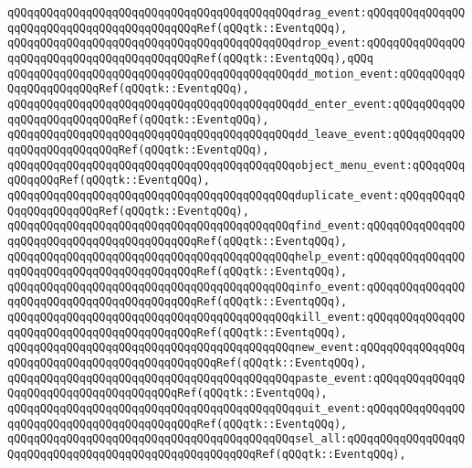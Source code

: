 \newline
\verb|qQQqqQQqqQQqqQQqqQQqqQQqqQQqqQQqqQQqqQQqqQQqdrag_event:qQQqqQQqqQQqqQQqqQQqqQQqqQQqqQQqqQQqqQQqqQQqRef(qQQqtk::EventqQQq),|\newline
\verb|qQQqqQQqqQQqqQQqqQQqqQQqqQQqqQQqqQQqqQQqqQQqdrop_event:qQQqqQQqqQQqqQQqqQQqqQQqqQQqqQQqqQQqqQQqqQQqRef(qQQqtk::EventqQQq),qQQq|\newline
\verb|qQQqqQQqqQQqqQQqqQQqqQQqqQQqqQQqqQQqqQQqqQQqdd_motion_event:qQQqqQQqqQQqqQQqqQQqqQQqRef(qQQqtk::EventqQQq),|\newline
\verb|qQQqqQQqqQQqqQQqqQQqqQQqqQQqqQQqqQQqqQQqqQQqdd_enter_event:qQQqqQQqqQQqqQQqqQQqqQQqqQQqRef(qQQqtk::EventqQQq),|\newline
\verb|qQQqqQQqqQQqqQQqqQQqqQQqqQQqqQQqqQQqqQQqqQQqdd_leave_event:qQQqqQQqqQQqqQQqqQQqqQQqqQQqRef(qQQqtk::EventqQQq),|\newline
\newline
\verb|qQQqqQQqqQQqqQQqqQQqqQQqqQQqqQQqqQQqqQQqqQQqobject_menu_event:qQQqqQQqqQQqqQQqRef(qQQqtk::EventqQQq),|\newline
\newline
\verb|qQQqqQQqqQQqqQQqqQQqqQQqqQQqqQQqqQQqqQQqqQQqduplicate_event:qQQqqQQqqQQqqQQqqQQqqQQqRef(qQQqtk::EventqQQq),|\newline
\verb|qQQqqQQqqQQqqQQqqQQqqQQqqQQqqQQqqQQqqQQqqQQqfind_event:qQQqqQQqqQQqqQQqqQQqqQQqqQQqqQQqqQQqqQQqqQQqRef(qQQqtk::EventqQQq),|\newline
\verb|qQQqqQQqqQQqqQQqqQQqqQQqqQQqqQQqqQQqqQQqqQQqhelp_event:qQQqqQQqqQQqqQQqqQQqqQQqqQQqqQQqqQQqqQQqqQQqRef(qQQqtk::EventqQQq),|\newline
\verb|qQQqqQQqqQQqqQQqqQQqqQQqqQQqqQQqqQQqqQQqqQQqinfo_event:qQQqqQQqqQQqqQQqqQQqqQQqqQQqqQQqqQQqqQQqqQQqRef(qQQqtk::EventqQQq),|\newline
\verb|qQQqqQQqqQQqqQQqqQQqqQQqqQQqqQQqqQQqqQQqqQQqkill_event:qQQqqQQqqQQqqQQqqQQqqQQqqQQqqQQqqQQqqQQqqQQqRef(qQQqtk::EventqQQq),|\newline
\verb|qQQqqQQqqQQqqQQqqQQqqQQqqQQqqQQqqQQqqQQqqQQqnew_event:qQQqqQQqqQQqqQQqqQQqqQQqqQQqqQQqqQQqqQQqqQQqqQQqRef(qQQqtk::EventqQQq),|\newline
\verb|qQQqqQQqqQQqqQQqqQQqqQQqqQQqqQQqqQQqqQQqqQQqpaste_event:qQQqqQQqqQQqqQQqqQQqqQQqqQQqqQQqqQQqqQQqRef(qQQqtk::EventqQQq),|\newline
\verb|qQQqqQQqqQQqqQQqqQQqqQQqqQQqqQQqqQQqqQQqqQQqquit_event:qQQqqQQqqQQqqQQqqQQqqQQqqQQqqQQqqQQqqQQqqQQqRef(qQQqtk::EventqQQq),|\newline
\verb|qQQqqQQqqQQqqQQqqQQqqQQqqQQqqQQqqQQqqQQqqQQqsel_all:qQQqqQQqqQQqqQQqqQQqqQQqqQQqqQQqqQQqqQQqqQQqqQQqqQQqqQQqRef(qQQqtk::EventqQQq),|\newline
